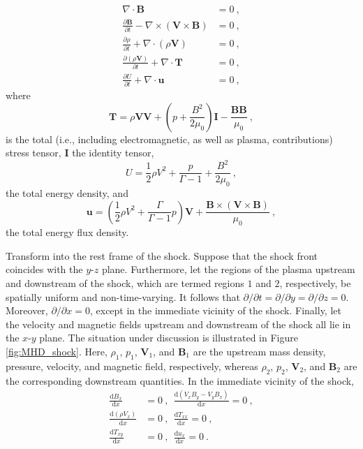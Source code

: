 \documentclass[12pt,a4paper]{article}
\renewcommand{\vec}[1]{\boldsymbol{#1}}
\newcommand{\dif}{\mathrm{d}}
\begin{document}
\begin{align}
\nabla \cdot \vec{B} &= 0 ~, \\
\frac{\partial \vec{B}}{\partial t} - \nabla \times (\vec{V} \times \vec{B}) &= 0 ~, \\
\frac{\partial \rho}{\partial t} + \nabla \cdot (\rho \vec{V}) &= 0 ~, \\
\frac{\partial (\rho \vec{V})}{\partial t} +\nabla \cdot \vec{T} &= 0 ~, \\
\frac{\partial U}{\partial t} +\nabla \cdot \vec{u} &= 0 ~,
\end{align}
where
\begin{equation}
\vec{T} = \rho \vec{V} \vec{V} +\left(p + \dfrac{B^2}{2\mu_0} \right) \vec{I} - \dfrac{\vec{B} \vec{B} }{\mu_0} ~,
\end{equation}
is the total (i.e., including electromagnetic, as well as plasma, contributions) stress tensor, $\vec{I}$ the identity tensor,
\begin{equation}
U = \frac{1}{2} \rho V^2 + \frac{p}{\Gamma -1} +\frac{B^2}{2 \mu_0} ~,
\end{equation}
the total energy density, and
\begin{equation}
\vec{u} = \left(\frac{1}{2} \rho V^2 + \dfrac{\Gamma}{\Gamma -1} p \right) \vec{V} + \frac{\vec{B} \times (\vec{V} \times \vec{B})}{\mu_0} ~,
\end{equation}
the total energy flux density.

Transform into the rest frame of the shock. Suppose that the shock front coincides with the $y$-$z$ plane. Furthermore, let the regions of the plasma upstream and downstream of the shock, which are termed regions $1$ and $2$, respectively, be spatially
uniform and non-time-varying. It follows that $\partial/\partial t = \partial/\partial y = \partial/\partial z = 0$. Moreover, $\partial /\partial x = 0$, except in the immediate vicinity of the shock. Finally, let the velocity and magnetic fields upstream and downstream of the shock all lie in the $x$-$y$ plane. The situation under discussion is illustrated in Figure \ref{fig:MHD_shock}. Here, $\rho_1$, $p_1$, $\vec{V}_1$, and $\vec{B}_1$ are the upstream mass density, pressure, velocity, and magnetic field, respectively, whereas $\rho_2$, $p_2$, $\vec{V}_2$, and $\vec{B}_2$ are the corresponding downstream quantities. In the immediate vicinity of the shock, 
\begin{align}
\frac{\dif B_x}{\dif x} &= 0 ~, ~~ \frac{\dif (V_x B_y-V_y B_x)}{\dif x} = 0 ~, \\
\frac{\dif (\rho V_x)}{\dif x} &= 0 ~, ~~ \frac{\dif T_{xx} }{\dif x} = 0 ~, \\
\frac{\dif T_{xy} }{\dif x} &= 0 ~, ~~ \frac{\dif u_{x} }{\dif x} = 0 ~.
\end{align}
\end{document}
